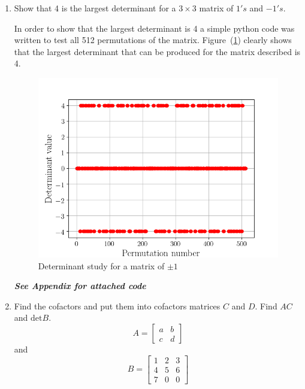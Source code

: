 \begin{enumerate}[label=\arabic*.]
                
    \item Show that 4 is the largest determinant for a $3 \times 3$ matrix
        of $1's$ and $-1's$.
        \begin{mdframed}[style=MyFrame]
            In order to show that the largest determinant is 4 a simple
            python code was written to test all 512 permutations of the
            matrix. Figure~(\ref{fig:det}) clearly shows that the largest
            determinant that can be produced for the matrix described is 4.
            \begin{figure}[H]
                \includegraphics[height=0.35\textheight]{../media/determinant-study.png}
                \caption{Determinant study for a matrix of $\pm 1$}
                \label{fig:det}
            \end{figure}
            \emph{\textbf{See Appendix for attached code}}
        \end{mdframed}

    \item Find the cofactors and put them into cofactors matrices $C$ and
        $D$. Find $AC$ and $\text{det}B$.
        \begin{equation}
          A = 
          \begin{bmatrix}
            a & b \\
            c & d
           \end{bmatrix}
        \end{equation}
        and 
        \begin{equation}
            B = 
            \begin{bmatrix}
                1 & 2 & 3 \\
                4 & 5 & 6 \\
                7 & 0 & 0
            \end{bmatrix}
        \end{equation}


\end{enumerate}
